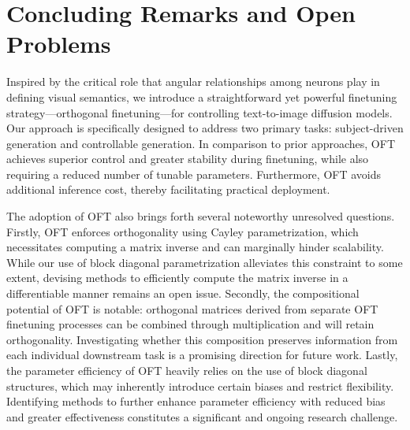 \section{Concluding Remarks and Open Problems}

Inspired by the critical role that angular relationships among neurons play in defining visual semantics, we introduce a straightforward yet powerful finetuning strategy—orthogonal finetuning—for controlling text-to-image diffusion models. Our approach is specifically designed to address two primary tasks: subject-driven generation and controllable generation. In comparison to prior approaches, OFT achieves superior control and greater stability during finetuning, while also requiring a reduced number of tunable parameters. Furthermore, OFT avoids additional inference cost, thereby facilitating practical deployment.

The adoption of OFT also brings forth several noteworthy unresolved questions. Firstly, OFT enforces orthogonality using Cayley parametrization, which necessitates computing a matrix inverse and can marginally hinder scalability. While our use of block diagonal parametrization alleviates this constraint to some extent, devising methods to efficiently compute the matrix inverse in a differentiable manner remains an open issue. Secondly, the compositional potential of OFT is notable: orthogonal matrices derived from separate OFT finetuning processes can be combined through multiplication and will retain orthogonality. Investigating whether this composition preserves information from each individual downstream task is a promising direction for future work. Lastly, the parameter efficiency of OFT heavily relies on the use of block diagonal structures, which may inherently introduce certain biases and restrict flexibility. Identifying methods to further enhance parameter efficiency with reduced bias and greater effectiveness constitutes a significant and ongoing research challenge.

